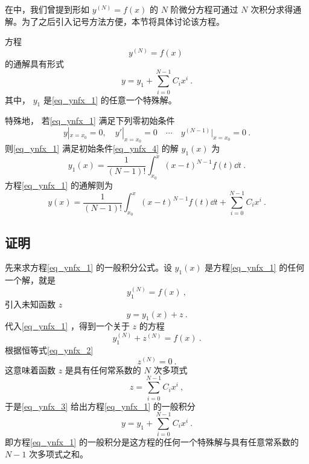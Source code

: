 
在中，我们曾提到形如 $y^{(N)}=f(x)$ 的 $N$ 阶微分方程可通过 $N$ 次积分求得通解。为了之后引入记号方法方便，本节将具体讨论该方程。

方程
\begin{equation}\label{eq_ynfx_1}
y^{(N)}=f(x)~
\end{equation}
的通解具有形式
\begin{equation}\label{eq_ynfx_7}
y=y_1+\sum_{i=0}^{N-1}C_ix^i~.
\end{equation}
其中， $y_1$ 是\autoref{eq_ynfx_1} 的任意一个特殊解。

特殊地， 若\autoref{eq_ynfx_1} 满足下列零初始条件
\begin{equation}\label{eq_ynfx_4}
y|_{x=x_0}=0,\quad y'|_{x=x_0}=0\quad\cdots \quad y^{(N-1)}|_{x=x_0}=0~.
\end{equation}
则\autoref{eq_ynfx_1} 满足初始条件\autoref{eq_ynfx_4} 的解 $y_1(x)$ 为
\begin{equation}\label{eq_ynfx_5}
y_1(x)=\frac{1}{(N-1)!}\int_{x_0}^x(x-t)^{N-1}f(t)\dd t~.
\end{equation}
方程\autoref{eq_ynfx_1} 的通解则为
\begin{equation}
y(x)=\frac{1}{(N-1)!}\int_{x_0}^x(x-t)^{N-1}f(t)\dd t+\sum_{i=0}^{N-1}C_ix^i~.
\end{equation}
\subsection{证明}
先来求方程\autoref{eq_ynfx_1} 的一般积分公式。设 $y_1(x)$ 是方程\autoref{eq_ynfx_1} 的任何一个解，就是
\begin{equation}\label{eq_ynfx_2}
y_1^{(N)}=f(x)~,
\end{equation}
引入未知函数 $z$
\begin{equation}\label{eq_ynfx_3}
y=y_1(x)+z~.
\end{equation}
代入\autoref{eq_ynfx_1} ，得到一个关于 $z$ 的方程
\begin{equation}
y_1^{(N)}+z^{(N)}=f(x)~.
\end{equation}
根据恒等式\autoref{eq_ynfx_2} 
\begin{equation}
z^{(N)}=0~.
\end{equation}
这意味着函数 $z$ 是具有任何常系数的 $N$ 次多项式
\begin{equation}
z=\sum_{i=0}^{N-1}C_ix^i~,
\end{equation}
于是\autoref{eq_ynfx_3} 给出方程\autoref{eq_ynfx_1} 的一般积分
\begin{equation}
y=y_1+\sum_{i=0}^{N-1}C_ix^i~.
\end{equation}
即方程\autoref{eq_ynfx_1} 的一般积分是这方程的任何一个特殊解与具有任意常系数的 $N-1$ 次多项式之和。

